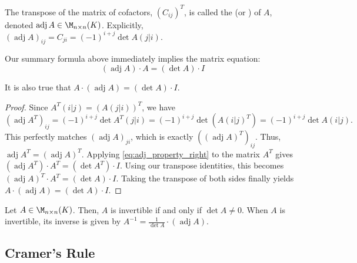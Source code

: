 \begin{definition*}\label{def:classical_adjoint}
  The transpose of the matrix of cofactors, $(C_{ij})^T$, is called the  (or ) of $A$, denoted $\operatorname{adj} A \in \M_{n \times n}(K)$. Explicitly, $(\operatorname{adj} A)_{ij} = C_{ji} = (-1)^{i+j} \det A(j|i)$.
\end{definition*}

Our summary formula above immediately implies the matrix equation:
\begin{equation} \label{eq:adj_property_right}
  (\operatorname{adj} A) \cdot A = (\det A) \cdot I
\end{equation}

\begin{lemma*}\label{lem:adj_property_left}
  It is also true that $A \cdot (\operatorname{adj} A) = (\det A) \cdot I$.
\end{lemma*}

\begin{proof}
  Since $A^T(i|j) = (A(j|i))^T$, we have
  \[(\operatorname{adj} A^T)_{ij} = (-1)^{i+j} \det A^T(j|i) = (-1)^{i+j} \det(A(i|j)^T) = (-1)^{i+j} \det A(i|j).\]
  This perfectly matches $(\operatorname{adj} A)_{ji}$, which is exactly $((\operatorname{adj} A)^T)_{ij}$. Thus, $\operatorname{adj} A^T = (\operatorname{adj} A)^T$.
  Applying \eqref{eq:adj_property_right} to the matrix $A^T$ gives $(\operatorname{adj} A^T) \cdot A^T = (\det A^T) \cdot I$. Using our transpose identities, this becomes $(\operatorname{adj} A)^T \cdot A^T = (\det A) \cdot I$. Taking the transpose of both sides finally yields $A \cdot (\operatorname{adj} A) = (\det A) \cdot I$.
\end{proof}

\begin{theorem}
  \label{thm:inverse_adjoint}
  Let $A \in \M_{n \times n}(K)$. Then, $A$ is invertible if and only if $\det A \neq 0$. When $A$ is invertible, its inverse is given by $A^{-1} = \frac{1}{\det A} \cdot (\operatorname{adj} A)$.
\end{theorem}

\subsection{Cramer's Rule}

